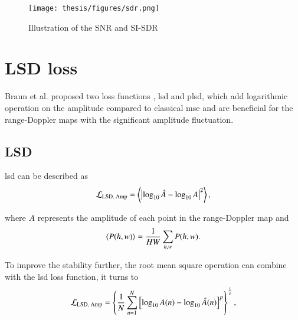 \begin{figure}
	\centering
	\texttt{[image: thesis/figures/sdr.png]}
	\caption{Illustration of the SNR and SI-SDR \cite{roux_sdr_2018}}
	\label{illustration of the snr and si-sdr}
\end{figure}

\section{LSD loss} \label{lsd loss}
Braun et al. proposed two loss functions \cite{braun_consolidated_2020}, \gls{lsd} and \gls{plsd}, which add logarithmic operation on the amplitude compared to classical \gls{mse} and are beneficial for the range-Doppler maps with the significant amplitude fluctuation.

\subsection{LSD}
\gls{lsd} can be described as
\begin{equation}
    \centering
    \mathcal{L}_{\text{LSD, Amp}} = \left\langle \left| \log_{10} \hat{A} - \log_{10} A \right|^2 \right\rangle,
\end{equation}

where $A$ represents the amplitude of each point in the range-Doppler map and
\begin{equation}
    \centering
    \left\langle P(h, w) \right\rangle = \frac{1}{H W} \sum_{h,w} P(h, w).
\end{equation}

To improve the stability further, the root mean square operation can combine with the \gls{lsd} loss function, it turns to
\begin{equation}
    \centering
    \mathcal{L}_{\text{LSD, Amp}} = \left\{ \frac{1}{N} \sum_{n=1}^{N} \left[ \log_{10} A(n) - \log_{10} \hat{A}(n) \right]^p \right\}^{\frac{1}{p}},
    \label{final lsd equation}
\end{equation}

